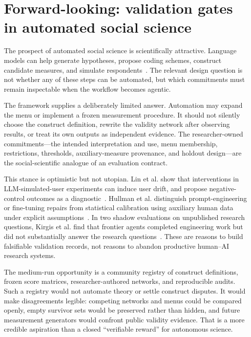 \documentclass[10pt,letterpaper]{article}
\begin{document}
\section{Forward-looking: validation gates in automated social science}
\label{app:automation}
The prospect of automated social science is scientifically attractive. Language models can help generate hypotheses, propose coding schemes, construct candidate measures, and simulate respondents~\cite{manning2024}. The relevant design question is not whether any of these steps can be automated, but which commitments must remain inspectable when the workflow becomes agentic.

The framework supplies a deliberately limited answer. Automation may expand the menu or implement a frozen measurement procedure. It should not silently choose the construct definition, rewrite the validity network after observing results, or treat its own outputs as independent evidence. The researcher-owned commitments---the intended interpretation and use, menu membership, restrictions, thresholds, auxiliary-measure provenance, and holdout design---are the social-scientific analogue of an evaluation contract.

This stance is optimistic but not utopian. Lin et al. show that interventions in LLM-simulated-user experiments can induce user drift, and propose negative-control outcomes as a diagnostic~\cite{illusion2026}. Hullman et al. distinguish prompt-engineering or fine-tuning repairs from statistical calibration using auxiliary human data under explicit assumptions~\cite{hullman2026}. In two shadow evaluations on unpublished research questions, Kirgis et al. find that frontier agents completed engineering work but did not substantially answer the research questions~\cite{kirgis2026}. These are reasons to build falsifiable validation records, not reasons to abandon productive human--AI research systems.

The medium-run opportunity is a community registry of construct definitions, frozen score matrices, researcher-authored networks, and reproducible audits. Such a registry would not automate theory or settle construct disputes. It would make disagreements legible: competing networks and menus could be compared openly, empty survivor sets would be preserved rather than hidden, and future measurement generators would confront public validity evidence. That is a more credible aspiration than a closed ``verifiable reward'' for autonomous science.
\end{document}
